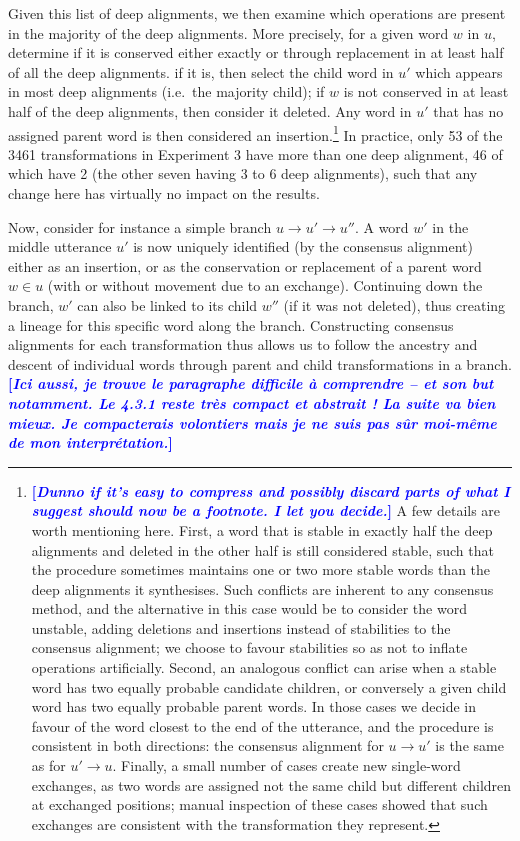 \documentclass[a4paper,fleqn]{cas-dc}
\newcommand{\tb}[1]{\textcolor{blue}{#1}}
\newcommand{\rk}[1]{\tb{{\footnotesize {\bf[\emph{#1}]}}}}
\begin{document}
Given this list of deep alignments, we then examine which operations are
present in the majority of the deep alignments. More precisely, for a
given word \(w\) in \(u\), determine if it is conserved either exactly
or through replacement in at least half of all the deep alignments. if
it is, then select the child word in \(u'\) which appears in most deep
alignments (i.e.~the majority child); if \(w\) is not conserved in at
least half of the deep alignments, then consider it deleted. Any word in
\(u'\) that has no assigned parent word is then considered an insertion.\footnote{\rk{Dunno if it's easy to compress and possibly discard parts of what I suggest should now be a footnote. I let you decide.}
A few details are worth mentioning here. First, a word that is stable in
exactly half the deep alignments and deleted in the other half is still
considered stable, such that the procedure sometimes maintains one or
two more stable words than the deep alignments it synthesises. Such
conflicts are inherent to any consensus method, and the alternative in
this case would be to consider the word unstable, adding deletions and
insertions instead of stabilities to the consensus alignment; we choose
to favour stabilities so as not to inflate operations artificially.
Second, an analogous conflict can arise when a stable word has two
equally probable candidate children, or conversely a given child word
has two equally probable parent words. In those cases we decide in
favour of the word closest to the end of the utterance, and the
procedure is consistent in both directions: the consensus alignment for
\(u \rightarrow u'\) is the same as for \(u' \rightarrow u\). Finally, a
small number of cases create new single-word exchanges, as two words are
assigned not the same child but different children at exchanged
positions; manual inspection of these cases showed that such exchanges
are consistent with the transformation they represent.}
In practice, only 53 of the 3461 transformations in Experiment 3 have more than one deep
alignment, 46 of which have 2 (the other seven having 3 to 6 deep
alignments), such that any change here has virtually no impact on the
results.

Now, consider for instance a simple branch
\(u \rightarrow u' \rightarrow u''\). A word \(w'\) in the middle
utterance \(u'\) is now uniquely identified (by the consensus alignment)
either as an insertion, or as the conservation or replacement of a
parent word \(w \in u\) (with or without movement due to an exchange).
Continuing down the branch, \(w'\) can also be linked to its child
\(w''\) (if it was not deleted), thus creating a lineage for this
specific word along the branch. Constructing consensus alignments for
each transformation thus allows us to follow the ancestry and descent of
individual words through parent and child transformations in a branch.
\rk{Ici aussi, je trouve le paragraphe difficile à comprendre -- et son but notamment. Le 4.3.1 reste très compact et abstrait ! La suite va bien mieux. Je compacterais volontiers mais je ne suis pas sûr moi-même de mon interprétation.}
\end{document}
